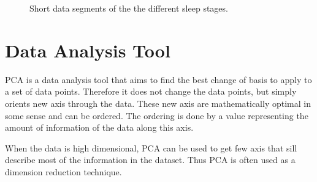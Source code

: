 \begin{figure}
	\centering

	\begin{subfigure}[b]{\textwidth}
	\end{subfigure}
	
	\caption{Short data segments of the the different sleep stages.}
	\label{fig:different_sleep_stages}
\end{figure}

\section{Data Analysis Tool}

PCA is a data analysis tool that aims to find the best change of basis to apply to a set of data points. Therefore it does not change the data points, but simply orients new axis through the data. These new axis are mathematically optimal in some sense and can be ordered. The ordering is done by a value representing the amount of information of the data along this axis.

When the data is high dimensional, PCA can be used to get few axis that sill describe most of the information in the dataset. Thus PCA is often used as a dimension reduction technique.
